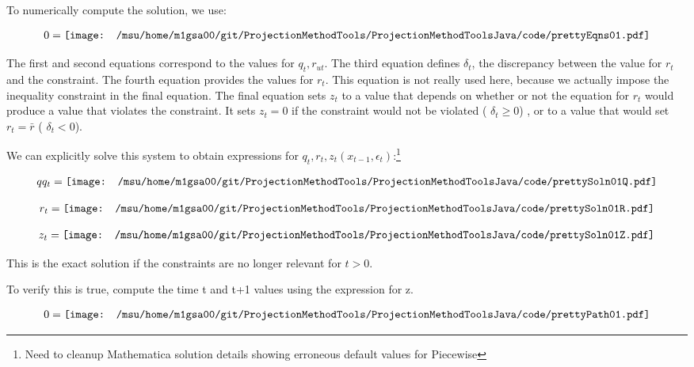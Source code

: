 \documentclass[12pt]{article}
\begin{document}
To numerically compute the solution, we use:

\begin{gather*}
  0=\vcenter{\hbox{\texttt{[image: /msu/home/m1gsa00/git/ProjectionMethodTools/ProjectionMethodToolsJava/code/prettyEqns01.pdf]}}}
\end{gather*}

The first and second equations correspond to the values for $q_t,r_{ut}$.
The third equation defines $\delta_t$, the discrepancy between the value for $r_t$ and the constraint.    The fourth equation provides the values for $r_t$.  This equation is not really used here, because we actually impose the inequality
constraint in the final equation. The final equation
 sets $z_t$ to a value that depends on 
whether or not the equation for $r_t$ would produce a value that violates the
constraint.  It sets $z_t=0$ if the constraint would  not be violated ( $\delta_t\ge0$) ,  or
to a value that would set $r_t=\bar{r}$ ( $\delta_t<0$).


We can explicitly solve this system to obtain  expressions for $q_t, r_t, z_{t}(x_{t-1},\epsilon_t) $:\footnote{Need to cleanup Mathematica solution details showing erroneous default values for Piecewise}

\begin{gather*}
  qq_t=\vcenter{\hbox{\texttt{[image: /msu/home/m1gsa00/git/ProjectionMethodTools/ProjectionMethodToolsJava/code/prettySoln01Q.pdf]}}}
\end{gather*}

\begin{gather*}
  r_t=\vcenter{\hbox{\texttt{[image: /msu/home/m1gsa00/git/ProjectionMethodTools/ProjectionMethodToolsJava/code/prettySoln01R.pdf]}}}
\end{gather*}

\begin{gather*}
  z_t=\vcenter{\hbox{\texttt{[image: /msu/home/m1gsa00/git/ProjectionMethodTools/ProjectionMethodToolsJava/code/prettySoln01Z.pdf]}}}
\end{gather*}

This is the exact solution if the constraints are no longer relevant for 
$t >0$.

To verify this is true, compute the time t and t+1 values using the expression for z.

\begin{gather*}
  0=\vcenter{\hbox{\texttt{[image: /msu/home/m1gsa00/git/ProjectionMethodTools/ProjectionMethodToolsJava/code/prettyPath01.pdf]}}}
\end{gather*}
\end{document}
